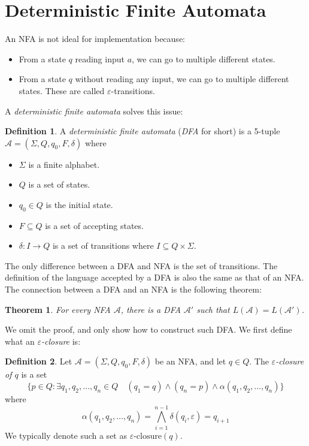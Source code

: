 \documentclass[titlepage]{article}
\theoremstyle{plain}
\newtheorem*{theorem}{Theorem}
\theoremstyle{definition}
\newtheorem*{definition}{Definition}
\theoremstyle{remark}
\begin{document}
\section{Deterministic Finite Automata}
An NFA is not ideal for implementation because:
\begin{itemize}
  \item From a state $q$ reading input $a$, we can go to multiple different
    states.
  \item From a state $q$ without reading any input, we can go to multiple
    different states. These are called $\varepsilon$-transitions.
\end{itemize}
A \textit{deterministic finite automata} solves this issue:
\begin{definition}
  A \textit{deterministic finite automata} (\textit{DFA} for short) is a 5-tuple
  $\mathcal{A}=(\Sigma,Q,q_0,F,\delta)$ where
  \begin{itemize}
    \item $\Sigma$ is a finite alphabet.
    \item $Q$ is a set of states.
    \item $q_0\in Q$ is the initial state.
    \item $F\subseteq Q$ is a set of accepting states.
    \item $\delta:I\to Q$ is a set of transitions where
      $I\subseteq Q\times\Sigma$.
  \end{itemize}
\end{definition}
The only difference between a DFA and NFA is the set of transitions. The
definition of the language accepted by a DFA is also the same as that of an
NFA\@. The connection between a DFA and an NFA is the following theorem:
\begin{theorem}
  For every NFA $\mathcal{A}$, there is a DFA $\mathcal{A}'$ such that
  $L(\mathcal{A})=L(\mathcal{A}')$.
\end{theorem}
We omit the proof, and only show how to construct such DFA\@. We first define
what an \textit{$\varepsilon$-closure} is:
\begin{definition}
  Let $\mathcal{A}=(\Sigma,Q,q_0,F,\delta)$ be an NFA, and let $q\in Q$. The
  \textit{$\varepsilon$-closure of $q$} is a set
  \[
    \{p\in Q:\exists q_1,q_2,\ldots,q_n\in Q\quad (q_1=q)\land(q_n=p)\land
    \alpha(q_1,q_2,\ldots,q_n)\}
  \]
  where
  \[
    \alpha(q_1,q_2,\ldots,q_n)=\bigwedge_{i=1}^{n-1}\delta(q_i,\varepsilon)=q_{i+1}
  \]
  We typically denote such a set as $\varepsilon\text{-closure}(q)$.
\end{definition}
\end{document}
